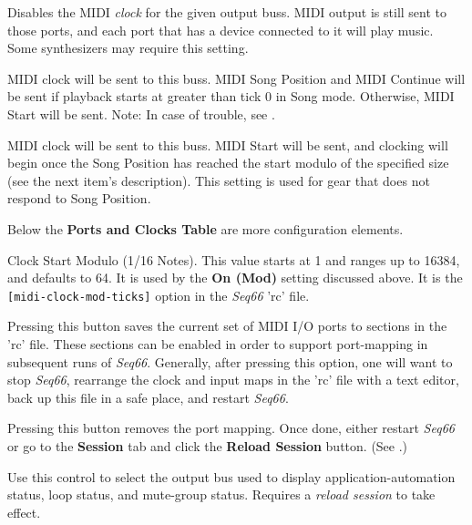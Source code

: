    Disables the MIDI \textsl{clock} for the given output buss.
   MIDI output is still sent to those ports, and
   each port that has a device connected to it will play music.
   Some synthesizers may require this setting.

   MIDI clock will be sent to this buss.
   MIDI Song Position and MIDI Continue will be sent if playback starts
   at greater than tick 0 in Song mode.  Otherwise, MIDI Start will be sent.
   Note: In case of trouble, see
   .

   MIDI clock will be sent to this buss.
   MIDI Start will be sent, and clocking will begin
   once the Song Position has reached the start modulo of the specified size
   (see the next item's description).
   This setting is used for gear that does not respond to Song Position.

   Below the \textbf{Ports and Clocks Table} are more configuration elements.

   \setcounter{ItemCounter}{0}      %

   Clock Start Modulo (1/16 Notes).
   This value starts at 1 and ranges up to 16384, and defaults to 64.
   It is used by the \textbf{On (Mod)} setting discussed above.
   It is the \texttt{[midi-clock-mod-ticks]} option in the \textsl{Seq66}
   'rc' file.

   Pressing this button saves the current set of MIDI I/O ports to sections in
   the 'rc' file.  These sections can be enabled in order to support
   port-mapping in subsequent runs of \textsl{Seq66}.
   Generally, after pressing this option, one will want to stop
   \textsl{Seq66}, rearrange the clock and input maps in the
   'rc' file with a text editor, back up this file in a safe place,
   and restart \textsl{Seq66}.

   Pressing this button removes the port mapping.
   Once done, either restart \textsl{Seq66} or go to the \textbf{Session}
   tab and click the \textbf{Reload Session} button.
   (See .)

   Use this control to select the output bus used to display
   application-automation status, loop status, and mute-group status.
   Requires a \textsl{reload session} to take effect.

